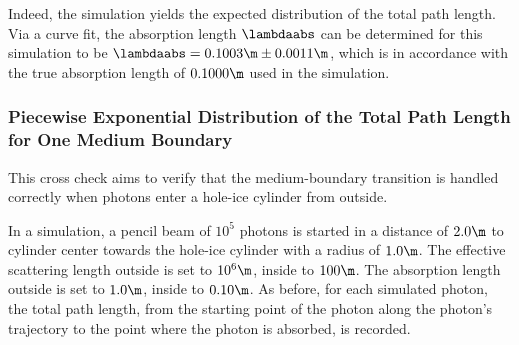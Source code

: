 
Indeed, the simulation yields the expected distribution of the total path length. Via a curve fit, the absorption length $\lambdaabs$ can be determined for this simulation to be $\lambdaabs = 0.1003\m \pm 0.0011\m$, which is in accordance with the true absorption length of $0.1000\m$ used in the simulation.


\subsubsection{Piecewise Exponential Distribution of the Total Path Length for One Medium Boundary}


This cross check aims to verify that the medium-boundary transition is handled correctly when photons enter a hole-ice cylinder from outside.


%

In a simulation, a pencil beam of $10^5$ photons is started in a distance of $2.0\m$ to cylinder center towards the hole-ice cylinder with a radius of $1.0\m$. The effective scattering length outside is set to $10^6\m$, inside to $100\m$. The absorption length outside is set to $1.0\m$, inside to $0.10\m$.
As before, for each simulated photon, the total path length, from the starting point of the photon along the photon's trajectory to the point where the photon is absorbed, is recorded.

